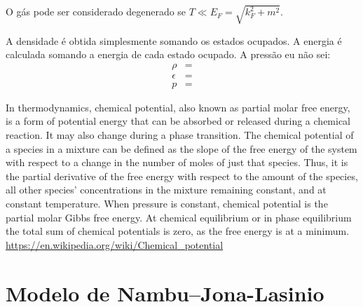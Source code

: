 O gás pode ser considerado degenerado se $T \ll E_F = \sqrt{k_F^2 + m^2}$.

A densidade é obtida simplesmente somando os estados ocupados. A energia é calculada somando a energia de cada estado ocupado. A pressão eu não sei:
\begin{align}
	\rho &= \\
	\epsilon &= \\
	p &=
\end{align}

In thermodynamics, chemical potential, also known as partial molar free energy, is a form of potential energy that can be absorbed or released during a chemical reaction. It may also change during a phase transition. The chemical potential of a species in a mixture can be defined as the slope of the free energy of the system with respect to a change in the number of moles of just that species. Thus, it is the partial derivative of the free energy with respect to the amount of the species, all other species' concentrations in the mixture remaining constant, and at constant temperature. When pressure is constant, chemical potential is the partial molar Gibbs free energy. At chemical equilibrium or in phase equilibrium the total sum of chemical potentials is zero, as the free energy is at a minimum. \url{https://en.wikipedia.org/wiki/Chemical_potential}

\section{Modelo de Nambu--Jona-Lasinio}

